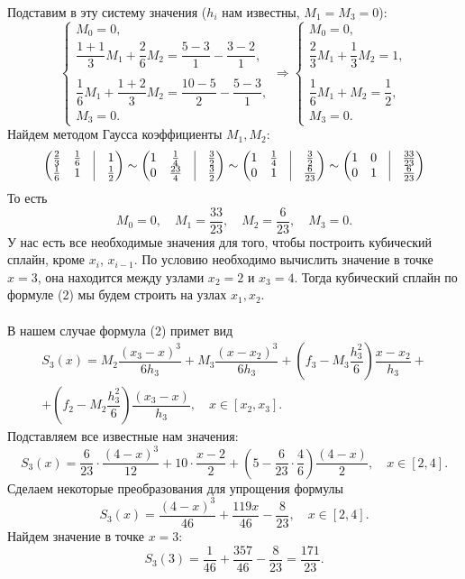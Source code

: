 \documentclass[a4paper, 12pt]{article}
\begin{document}
	Подставим в эту систему значения ($h_i$ нам известны, $M_1 = M_3 = 0$):
	$$\begin{cases}
		M_0 = 0,\\
		\dfrac{1 + 1}{3}M_1 + \dfrac{2}{6}M_{2} = \dfrac{5 - 3}{1} - \dfrac{3 - 2}{1},\\\\
		\dfrac{1}{6}M_{1} + \dfrac{1+2}{3}M_2 = \dfrac{10 - 5}{2} - \dfrac{5 - 3}{1},\\
		M_3=0.
	\end{cases}
	\Rightarrow 
	\begin{cases}
		M_0 = 0,\\
		\dfrac{2}{3}M_1 + \dfrac{1}{3}M_{2} = 1,\\\\
		\dfrac{1}{6}M_{1} + M_2 = \dfrac12,\\
		M_3=0.
	\end{cases}$$
	Найдем методом Гаусса коэффициенты $M_1, M_2$:
	$$
	\begin{pmatrix}
		\frac23&\frac16&\vline&1\\
		\frac16&1&\vline&\frac12
	\end{pmatrix}
	\sim
	\begin{pmatrix}
		1&\frac14&\vline&\frac32\\
		0&\frac{23}{4}&\vline&\frac32
	\end{pmatrix}
	\sim 
	\begin{pmatrix}
		1&\frac14&\vline&\frac32\\
		0&1&\vline&\frac{6}{23}
	\end{pmatrix}
	\sim
	\begin{pmatrix}
		1&0&\vline&\frac{33}{23}\\
		0&1&\vline&\frac{6}{23}
	\end{pmatrix}$$
	То есть $$M_0 = 0,\quad M_1 = \dfrac{33}{23},\quad M_2 = \dfrac{6}{23},\quad M_3 = 0.$$
	У нас есть все необходимые значения для того, чтобы построить кубический сплайн, кроме $x_i$, $x_{i-1}$. По условию необходимо вычислить значение в точке $x=3$, она находится между узлами $x_2 = 2$ и $x_3 = 4$. Тогда кубический сплайн по формуле (2) мы будем строить на узлах $x_1, x_2$.\\\\
	В нашем случае формула (2) примет вид 
	\begin{multline*}
		S_3(x) = M_2\dfrac{(x_3 - x)^3}{6h_3} + M_{3}\dfrac{(x-x_2)^3}{6h_3} + \left(f_3 - M_3\dfrac{h_3^2}{6}\right)\dfrac{x-x_2}{h_3} +\\+ \left(f_2 - M_2\dfrac{h_3^2}{6}\right)\dfrac{(x_3 - x)}{h_3},\quad x\in [x_2, x_3].
	\end{multline*}
	Подставляем все известные нам значения:
	$$
	S_3(x) = \dfrac{6}{23}\cdot\dfrac{(4 - x)^3}{12} + 10\cdot\dfrac{x-2}{2} + \left(5 - \dfrac{6}{23}\cdot\dfrac{4}{6}\right)\dfrac{(4 - x)}{2},\quad x\in [2, 4].
	$$
	Сделаем некоторые преобразования для упрощения формулы
	$$
	S_3(x) = \dfrac{(4 - x)^3}{46} + \dfrac{119x}{46}-\dfrac{8}{23},\quad x\in [2, 4].
	$$
	Найдем значение в точке $x=3$:
	$$
	S_3(3) = \dfrac{1}{46} + \dfrac{357}{46} - \dfrac{8}{23} = \dfrac{171}{23}.
	$$
\end{document}
